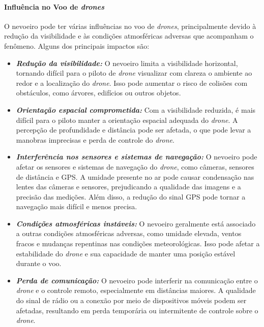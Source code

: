 \documentclass[a4paper, 12pt, onecolumn,singlespacing]{article}
\begin{document}
	\paragraph{Influência no Voo de \textit{drones}}
	
	O nevoeiro pode ter várias influências no voo de \textit{drones}, principalmente devido à redução da visibilidade e às condições atmosféricas adversas que acompanham o fenômeno. Alguns dos principais impactos são:
	
	\begin{itemize}
		\item \textbf{\textit{Redução da visibilidade:}} O nevoeiro limita a visibilidade horizontal, tornando difícil para o piloto de \textit{drone} visualizar com clareza o ambiente ao redor e a localização do \textit{drone}. Isso pode aumentar o risco de colisões com obstáculos, como árvores, edifícios ou outros objetos.
		
		\item \textbf{\textit{Orientação espacial comprometida:}} Com a visibilidade reduzida, é mais difícil para o piloto manter a orientação espacial adequada do \textit{drone}. A percepção de profundidade e distância pode ser afetada, o que pode levar a manobras imprecisas e perda de controle do \textit{drone}.
		
		\item \textbf{\textit{Interferência nos sensores e sistemas de navegação:}} O nevoeiro pode afetar os sensores e sistemas de navegação do \textit{drone}, como câmeras, sensores de distância e GPS. A umidade presente no ar pode causar condensação nas lentes das câmeras e sensores, prejudicando a qualidade das imagens e a precisão das medições. Além disso, a redução do sinal GPS pode tornar a navegação mais difícil e menos precisa.
		
		\item \textbf{\textit{Condições atmosféricas instáveis:}} O nevoeiro geralmente está associado a outras condições atmosféricas adversas, como umidade elevada, ventos fracos e mudanças repentinas nas condições meteorológicas. Isso pode afetar a estabilidade do \textit{drone} e sua capacidade de manter uma posição estável durante o voo.
		
		\item \textbf{\textit{Perda de comunicação:}} O nevoeiro pode interferir na comunicação entre o \textit{drone} e o controle remoto, especialmente em distâncias maiores. A qualidade do sinal de rádio ou a conexão por meio de dispositivos móveis podem ser afetadas, resultando em perda temporária ou intermitente de controle sobre o \textit{drone}.
	\end{itemize}
	
\end{document}
